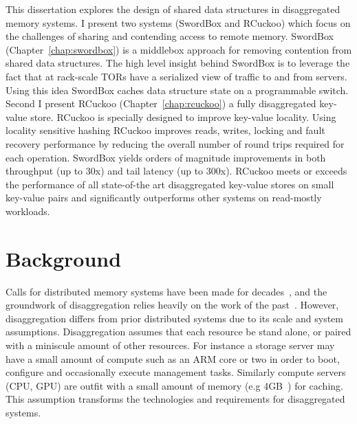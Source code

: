 \documentclass[12pt]{ucsddissertation}
\newcommand{\sword}{SwordBox}
\begin{document}
\begin{dissertationintroduction}
This dissertation explores the design of shared data structures in disaggregated memory systems.  I
present two systems ({\sword} and RCuckoo) which focus on the challenges of sharing and contending
access to remote memory. {\sword} (Chapter~\ref{chap:swordbox}) is a middlebox approach for removing
contention from shared data structures. The high level insight behind {\sword} is to leverage the
fact that at rack-scale TORs have a serialized view of traffic to and from servers. Using this idea
{\sword} caches data structure state on a programmable switch. 
Second I present RCuckoo (Chapter~\ref{chap:rcuckoo}) a fully disaggregated key-value store. RCuckoo
is specially designed to improve key-value locality. Using locality sensitive hashing RCuckoo
improves reads, writes, locking and fault recovery performance by reducing the overall number of
round trips required for each operation.
{\sword} yields orders of magnitude improvements in both
throughput (up to 30x) and tail latency (up to 300x).  RCuckoo meets or exceeds the performance of
all state-of-the art disaggregated key-value stores on small key-value pairs and significantly
outperforms other systems on read-mostly workloads.

\end{dissertationintroduction}

\chapter{Background}

Calls for distributed memory systems have been made for decades~, and the groundwork of disaggregation relies heavily on the work of the
past~\cite{treadmarks,gms}. However, disaggregation differs from prior distributed systems due to
its scale and system assumptions. 
Disaggregation assumes that each resource be stand alone, or paired with a miniscule amount of other
resources. For instance a storage server may have a small amount of compute such as an ARM core or
two in order to boot, configure and occasionally execute management tasks. Similarly compute servers
(CPU, GPU) are outfit with a small amount of memory (e.g 4GB~\cite{legoos}) for caching.
This assumption transforms the technologies and requirements for disaggregated systems.

\end{document}
